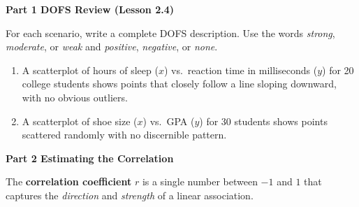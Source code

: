 \documentclass[10pt]{article}
\begin{document}
\namedateperiod

\vspace{0.2in}

{\large\bfseries\color{navy} Part 1 \quad DOFS Review (Lesson 2.4)}

\vspace{0.1in}

\noindent For each scenario, write a complete DOFS description. Use the words
\textit{strong}, \textit{moderate}, or \textit{weak} and \textit{positive},
\textit{negative}, or \textit{none}.

\vspace{0.08in}

\begin{enumerate}[leftmargin=1.6em, itemsep=0.18in]

  \item A scatterplot of hours of sleep ($x$) vs.\ reaction time in milliseconds ($y$)
        for 20 college students shows points that closely follow a line sloping downward,
        with no obvious outliers.\\[8pt]

  \item A scatterplot of shoe size ($x$) vs.\ GPA ($y$) for 30 students shows points
        scattered randomly with no discernible pattern.\\[8pt]

\end{enumerate}

\vspace{0.22in}

{\large\bfseries\color{navy} Part 2 \quad Estimating the Correlation}

\vspace{0.1in}

\noindent The \textbf{correlation coefficient} $r$ is a single number between $-1$ and $1$
that captures the \emph{direction} and \emph{strength} of a linear association.

\vspace{0.1in}
\end{document}
